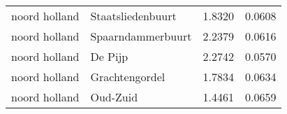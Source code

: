 \begin{longtable}{llcc}
	noord holland & Staatsliedenbuurt       & 1.8320  & 0.0608                               \\
	noord holland & Spaarndammerbuurt       & 2.2379  & 0.0616                               \\
	noord holland & De Pijp                 & 2.2742  & 0.0570                               \\
	noord holland & Grachtengordel          & 1.7834  & 0.0634                               \\
	noord holland & Oud-Zuid                & 1.4461  & 0.0659                               \\
	\hline
\end{longtable}
